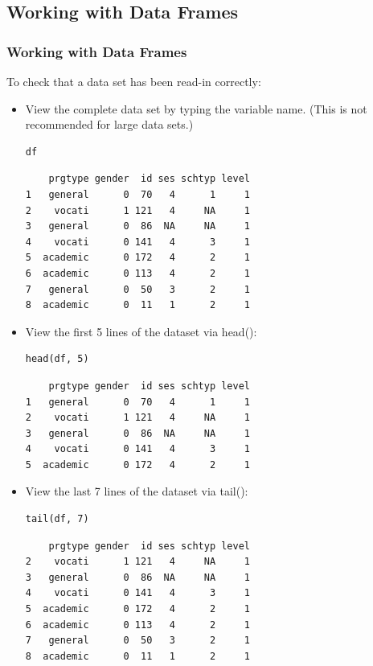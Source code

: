 \subsection{Working with Data Frames}
\begin{frame}
	\frametitle{Working with Data Frames}
	To check that a data set has been read-in correctly: 
	\begin{itemize}
		\item View the complete data set by typing the variable name.  (This is not recommended for large data sets.) 
\begin{lstlisting}
df
\end{lstlisting}

{ \small
\begin{verbatim}
    prgtype gender  id ses schtyp level
1   general      0  70   4      1     1
2    vocati      1 121   4     NA     1
3   general      0  86  NA     NA     1
4    vocati      0 141   4      3     1
5  academic      0 172   4      2     1
6  academic      0 113   4      2     1
7   general      0  50   3      2     1
8  academic      0  11   1      2     1
\end{verbatim}
}

\newpage		
		\item View the first 5 lines of the dataset via \ttfamily head(): \normalfont 
\begin{lstlisting}
head(df, 5) 
\end{lstlisting}

\begin{verbatim}
    prgtype gender  id ses schtyp level
1   general      0  70   4      1     1
2    vocati      1 121   4     NA     1
3   general      0  86  NA     NA     1
4    vocati      0 141   4      3     1
5  academic      0 172   4      2     1
\end{verbatim}

\newpage
		\item View the last 7 lines of the dataset via \ttfamily tail(): \normalfont 
\begin{lstlisting}
tail(df, 7)
\end{lstlisting}

\begin{verbatim}
    prgtype gender  id ses schtyp level
2    vocati      1 121   4     NA     1
3   general      0  86  NA     NA     1
4    vocati      0 141   4      3     1
5  academic      0 172   4      2     1
6  academic      0 113   4      2     1
7   general      0  50   3      2     1
8  academic      0  11   1      2     1
\end{verbatim}		


\end{itemize}
\end{frame}
